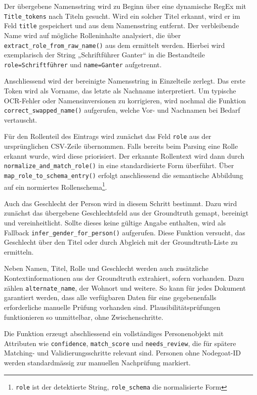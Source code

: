 \documentclass[12pt, a4paper, ngerman, bidi=default]{article}
\newcommand{\code}[1]{\colorbox{VeryLightGray}{\texttt{#1}}} %
\begin{document}
Der übergebene Namensstring wird zu Beginn über eine dynamische RegEx mit \code{Title\_tokens} nach Titeln gesucht. Wird ein solcher Titel erkannt, wird er im Feld \code{title} gespeichert und aus dem Namensstring entfernt. Der verbleibende Name wird auf mögliche Rolleninhalte analysiert, die über \code{extract\_role\_from\_raw\_name()} aus dem  ermittelt werden. Hierbei wird exemplarisch der String „Schriftführer Ganter“ in die Bestandteile \code{role=Schriftführer} und \code{name=Ganter} aufgetrennt.

Anschliessend wird der bereinigte Namensstring in Einzelteile zerlegt. Das erste Token wird als Vorname, das letzte als Nachname interpretiert. Um typische OCR-Fehler oder Namensinversionen zu korrigieren, wird nochmal die Funktion \code{correct\_swapped\_name()} aufgerufen, welche Vor- und Nachnamen bei Bedarf vertauscht.

Für den Rollenteil des Eintrags wird zunächst das Feld \code{role} aus der ursprünglichen CSV-Zeile übernommen. Falls bereits beim Parsing eine Rolle erkannt wurde, wird diese priorisiert. Der erkannte Rollentext wird dann durch \code{normalize\_and\_match\_role()} in eine standardisierte Form überführt. Über \code{map\_role\_to\_schema\_entry()} erfolgt anschliessend die semantische Abbildung auf ein normiertes Rollenschema\footnote{\code{role} ist der detektierte String, \code{role\_schema} die normalisierte Form}.

Auch das Geschlecht der Person wird in diesem Schritt bestimmt. Dazu wird zunächst das übergebene Geschlechtsfeld aus der Groundtruth gemapt, bereinigt und vereinheitlicht. Sollte dieses keine gültige Angabe enthalten, wird als Fallback \code{infer\_gender\_for\_person()} aufgerufen. Diese Funktion versucht, das Geschlecht über den Titel oder durch Abgleich mit der Groundtruth-Liste zu ermitteln.

Neben Namen, Titel, Rolle und Geschlecht werden auch zusätzliche Kontextinformationen aus der Groundtruth extrahiert, sofern vorhanden. Dazu zählen \code{alternate\_name}, der Wohnort und weitere. So kann für jedes Dokument garantiert werden, dass alle verfügbaren Daten für eine gegebenenfalls erforderliche manuelle Prüfung vorhanden sind. Plausibilitätsprüfungen funktionieren so unmittelbar, ohne Zwischenschritte.

Die Funktion erzeugt abschliessend ein vollständiges Personenobjekt mit Attributen wie \code{confidence}, \code{match\_score} und \code{needs\_review}, die für spätere Matching- und Validierungsschritte relevant sind. Personen ohne Nodegoat-ID werden standardmässig zur manuellen Nachprüfung markiert.
 
\end{document}
